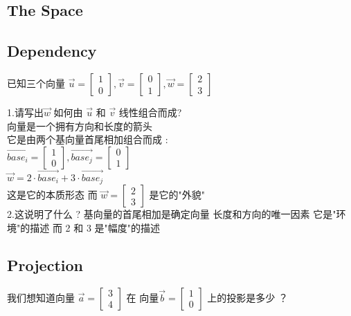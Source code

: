 \documentclass[12pt]{article}
\begin{document}
\begin{flushleft}
\subsection*{The Space}
\subsection*{Dependency}
已知三个向量 $\vec{u} =  \begin{bmatrix}
    1 \\ 0
\end{bmatrix}, \vec{v} = \begin{bmatrix}
    0 \\ 1
\end{bmatrix}, \vec{w} = \begin{bmatrix}
    2 \\ 3
\end{bmatrix}$

1.请写出$\vec{w}$ 如何由 $\vec{u}$ 和 $\vec{v}$ 线性组合而成?\\
向量是一个拥有方向和长度的箭头 \\ 
它是由两个基向量首尾相加组合而成 : \\ 
$\vec{base_i} = \begin{bmatrix}
    1 \\ 0
\end{bmatrix} ,\vec{base_j} = \begin{bmatrix}
    0 \\ 1 
\end{bmatrix}$\\
$\vec{w} = 2 \cdot \vec{base_i} + 3 \cdot \vec{base_j}$ \\
这是它的本质形态 而 $\vec{w} = \begin{bmatrix}
    2 \\ 3
\end{bmatrix}$ 是它的"外貌"\\

2.这说明了什么 ?
基向量的首尾相加是确定向量 长度和方向的唯一因素 它是"环境"的描述
而 2 和 3 是"幅度"的描述

\subsection*{Projection}
我们想知道向量 $\vec{a} = \begin{bmatrix}
    3 \\ 4
\end{bmatrix}$ 在 向量$\vec{b} = \begin{bmatrix}
    1 \\ 0
\end{bmatrix}$ 上的投影是多少 ？ \\


\end{flushleft}
\end{document}
